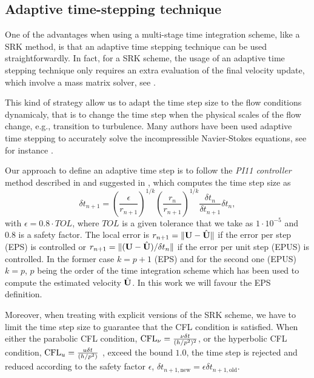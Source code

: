\subsection{Adaptive time-stepping technique}
\label{subsec-C7_adaptive}
One of the advantages when using a multi-stage time integration scheme, like a SRK method, is that an adaptive time stepping technique can be used straightforwardly. In fact, for a SRK scheme, the usage of an adaptive time stepping technique only requires an extra evaluation of the final velocity update, which involve a mass matrix solver, see \cite{gustafsson_control_1991,gustafsson_control-theoretic_1994}.

This kind of strategy allow us to adapt the time step size to the flow conditions dynamicaly, that is to change the time step when the physical scales of the flow change, e.g., transition to turbulence. Many authors have been used adaptive time stepping to accurately solve the incompressible Navier-Stokes equations, see for instance \cite{feng_time-adaptive_2000,john_adaptive_2010,kay_adaptive_2010,veneziani_aladins:_2013}.

Our approach to define an adaptive time step is to follow the \textit{PI11 controller} method described in \cite{soderlind_automatic_2002} and suggested in \cite{gustafsson_control-theoretic_1994}, which computes the time step size as
$$\delta t_{n+1}=\left(\frac{\epsilon}{r_{n+1}}\right)^{1/k}\left(\frac{r_n}{r_{n+1}}\right)^{1/k}\frac{\delta t_n}{\delta t_{n+1}}\delta t_n,$$
with $\epsilon=0.8\cdot TOL$, where $TOL$ is a given tolerance that we take as $1\cdot10^{-5}$ and $0.8$ is a safety factor. The local error is $r_{n+1}=\|{\bf U}-\hat{{\bf U}}\|$ if the error per step (EPS) is controlled or $r_{n+1}=\|({\bf U}-\hat{{\bf U}})/\delta t_n\|$ if the error per unit step (EPUS) is controlled. In the former case $k=p+1$ (EPS) and for the second one (EPUS) $k=p$, $p$ being the order of the time integration scheme which has been used to compute the estimated velocity $\hat{{\bf U}}$. In this work we will favour the EPS definition.

Moreover, when treating with explicit versions of the SRK scheme, we have to limit the time step size to guarantee that the CFL condition is satisfied. When either the parabolic CFL condition, ${\rm CFL}_\nu=\frac{\nu\delta t}{(h/p^2)^2}$, or the hyperbolic CFL condition, ${\rm CFL}_u =\frac{u\delta t}{(h/p^2)}$ , exceed the bound $ 1.0 $, the time step is rejected and reduced according to the safety factor $ \epsilon $, $ \delta t_{n+1,\mbox{new}}=\epsilon\delta t_{n+1,\mbox{old}} $.

